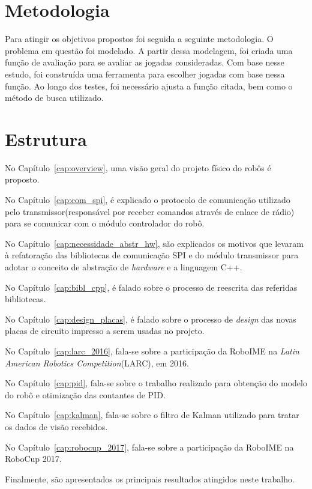 \section{Metodologia}

Para atingir os objetivos propostos foi seguida a seguinte metodologia.
O problema em questão foi modelado. A partir dessa modelagem, foi
criada uma função de avaliação para se avaliar as jogadas consideradas.
Com base nesse estudo, foi construída uma ferramenta para escolher
jogadas com base nessa função. Ao longo dos testes, foi necessário
ajusta a função citada, bem como o método de busca utilizado.

\section{Estrutura}

%
%
%
%
%
%

No Capítulo~\ref{cap:overview}, uma visão geral do projeto físico do robôs é proposto.

No Capítulo~\ref{cap:com_spi}, é explicado o protocolo de comunicação utilizado pelo transmissor(responsável por receber comandos através de enlace de rádio) para se comunicar com o módulo controlador do robô.

No Capítulo~\ref{cap:necessidade_abstr_hw}, são explicados os motivos que levaram à refatoração das bibliotecas de comunicação SPI e do módulo transmissor para adotar o conceito de abstração de \textit{hardware} e a linguagem C++. 

No Capítulo~\ref{cap:bibl_cpp}, é falado sobre o processo de reescrita das referidas bibliotecas.

No Capítulo~\ref{cap:design_placas}, é falado sobre o processo de \textit{design} das novas placas de circuito impresso a serem usadas no projeto.

No Capítulo~\ref{cap:larc_2016}, fala-se sobre a participação da RoboIME na \textit{Latin American Robotics Competition}(LARC), em 2016.

No Capítulo~\ref{cap:pid}, fala-se sobre o trabalho realizado para obtenção do modelo do robô e otimização das contantes de PID.

No Capítulo~\ref{cap:kalman}, fala-se sobre o filtro de Kalman utilizado para tratar os dados de visão recebidos.

No Capítulo~\ref{cap:robocup_2017}, fala-se sobre a participação da RoboIME na RoboCup 2017.


Finalmente, são apresentados os principais resultados atingidos neste trabalho.

